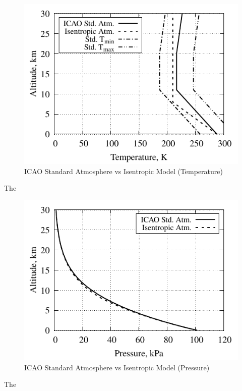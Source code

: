 \documentclass[conf]{new-aiaa} %
\begin{document}
\begin{figure}[hbt!] %
    \centering
    \includegraphics[]{media/atmosphere_validation_files/ICAO_vs_ISEN_temperature.pdf}
    \caption{\label{fig:partbtemp}ICAO Standard Atmosphere vs Isentropic Model (Temperature)}
\end{figure}
The

\begin{figure}[hbt!] %
    \centering
    \includegraphics[]{media/atmosphere_validation_files/ICAO_vs_ISEN_pressure.pdf}
    \caption{\label{fig:partbpres}ICAO Standard Atmosphere vs Isentropic Model (Pressure)}
\end{figure}
The
\end{document}
